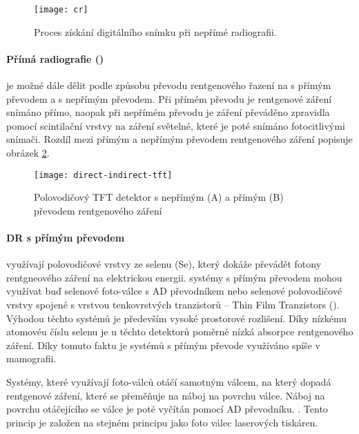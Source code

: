 \begin{figure}[ht]
\centering
\texttt{[image: cr]}
\caption{Proces získání digitálního snímku při nepřímé radiografii. \cite[str.~677]{Advances-in-Digital-Radiography}}
\label{fig:cr}
\end{figure}

\paragraph{Přímá radiografie ()}
 je možné dále dělit podle způsobu převodu rentgenového řazení na  s přímým  převodem a  s nepřímým převodem. Při přímém převodu je rentgenové záření snímáno přímo, naopak při nepřímém převodu je záření převáděno zpravidla pomocí scintilační vrstvy na záření světelné, které je poté snímáno fotocitlivými snímači. Rozdíl mezi přímým a nepřímým převodem rentgenového záření popisuje obrázek \cref{fig:direct-indirect-tft}.

\begin{figure}[ht]
\centering
\texttt{[image: direct-indirect-tft]}
\caption{Polovodičový TFT detektor s nepřímým (A) a přímým (B) převodem rentgenového záření \cite[str.~511]{Radiation-Detection-and-Measurement}}
\label{fig:direct-indirect-tft}
\end{figure}

\paragraph{DR s přímým převodem}
využívají polovodičové vrstvy ze selenu (Se), který dokáže převádět fotony rentgneového záření na elektrickou energii.  systémy s přímým převodem mohou využívat buď selenové foto-válce s AD převodníkem nebo selenové polovodičové vrstvy spojené s vrstvou tenkovrstvých tranzistorů -- Thin Film Tranzistors (). \cite[str.~678]{Advances-in-Digital-Radiography} Výhodou těchto systémů je především vysoké prostorové rozlišení. Díky nízkému atomovéu číslu selenu je u těchto detektorů poměrně nízká absorpce rentgenového záření. Díky tomuto faktu je systémů s přímým převode využíváno spíše v mamografii. \cite[str~210]{Diagnostic-Radiology}

Systémy, které využívají foto-válců otáčí samotným válcem, na který dopadá rentgenové záření, které se přeměňuje na náboj na povrchu válce. Náboj na povrchu otáčejícího se válce je poté vyčítán pomocí AD převodníku. \cite[str.~677]{Advances-in-Digital-Radiography}. Tento princip je založen na stejném principu jako foto válec laserových tiskáren.
 
